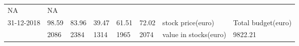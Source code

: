 \documentclass[
  11pt,
]{article}
\begin{document}
\begin{longtable}[]{@{}llllllll@{}}
\begin{minipage}[t]{0.06\columnwidth}
NA\strut
\end{minipage} & \begin{minipage}[t]{0.06\columnwidth}\raggedright
NA\strut
\end{minipage} & \begin{minipage}[t]{0.19\columnwidth}\raggedright
\strut
\end{minipage} & \begin{minipage}[t]{0.16\columnwidth}\raggedright
\strut
\end{minipage}\tabularnewline
\begin{minipage}[t]{0.10\columnwidth}\raggedright
31-12-2018\strut
\end{minipage} & \begin{minipage}[t]{0.06\columnwidth}\raggedright
98.59\strut
\end{minipage} & \begin{minipage}[t]{0.07\columnwidth}\raggedright
83.96\strut
\end{minipage} & \begin{minipage}[t]{0.07\columnwidth}\raggedright
39.47\strut
\end{minipage} & \begin{minipage}[t]{0.06\columnwidth}\raggedright
61.51\strut
\end{minipage} & \begin{minipage}[t]{0.06\columnwidth}\raggedright
72.02\strut
\end{minipage} & \begin{minipage}[t]{0.19\columnwidth}\raggedright
stock price(euro)\strut
\end{minipage} & \begin{minipage}[t]{0.16\columnwidth}\raggedright
Total budget(euro)\strut
\end{minipage}\tabularnewline
\begin{minipage}[t]{0.10\columnwidth}\raggedright
\strut
\end{minipage} & \begin{minipage}[t]{0.06\columnwidth}\raggedright
2086\strut
\end{minipage} & \begin{minipage}[t]{0.07\columnwidth}\raggedright
2384\strut
\end{minipage} & \begin{minipage}[t]{0.07\columnwidth}\raggedright
1314\strut
\end{minipage} & \begin{minipage}[t]{0.06\columnwidth}\raggedright
1965\strut
\end{minipage} & \begin{minipage}[t]{0.06\columnwidth}\raggedright
2074\strut
\end{minipage} & \begin{minipage}[t]{0.19\columnwidth}\raggedright
value in stocks(euro)\strut
\end{minipage} & \begin{minipage}[t]{0.16\columnwidth}\raggedright
9822.21\strut
\end{minipage}\tabularnewline
\bottomrule
\end{longtable}
\end{document}
